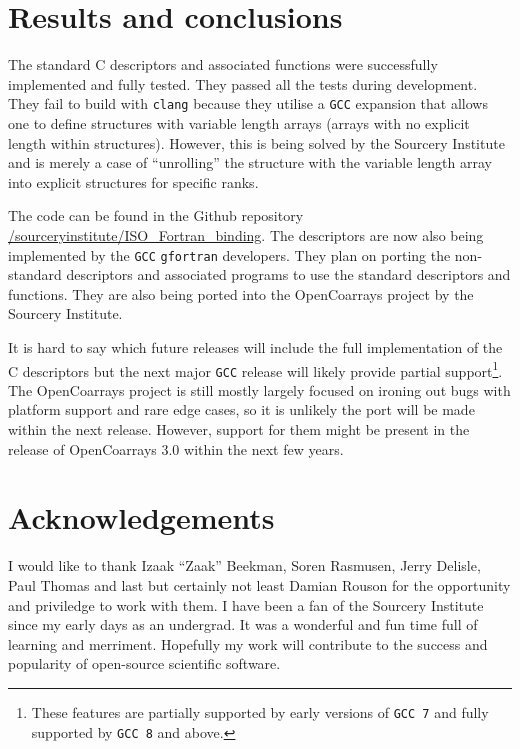 \section{Results and conclusions}

The standard C descriptors and associated functions were successfully implemented and fully tested. They passed all the tests during development. They fail to build with \texttt{clang} because they utilise a \texttt{GCC} expansion that allows one to define structures with variable length arrays (arrays with no explicit length within structures). However, this is being solved by the Sourcery Institute \cite{sourcery} and is merely a case of ``unrolling'' the structure with the variable length array into explicit structures for specific ranks.

The code can be found in the Github repository \newline{}\href{https://github.com/sourceryinstitute/ISO_Fortran_binding}{/sourceryinstitute/ISO\_Fortran\_binding}. The descriptors are now also being implemented by the \texttt{GCC} \texttt{gfortran} developers. They plan on porting the non-standard descriptors and associated programs to use the standard descriptors and functions. They are also being ported into the OpenCoarrays project \cite{ocafp} by the Sourcery Institute.

It is hard to say which future releases will include the full implementation of the C descriptors but the next major \texttt{GCC} release will likely provide partial support\footnote{These features are partially supported by early versions of \texttt{GCC 7} and fully supported by \texttt{GCC 8} and above.}. The OpenCoarrays project is still mostly largely focused on ironing out bugs with platform support and rare edge cases, so it is unlikely the port will be made within the next release. However, support for them might be present in the release of OpenCoarrays 3.0 within the next few years.

\section{Acknowledgements}

I would like to thank Izaak ``Zaak'' Beekman, Soren Rasmusen, Jerry Delisle, Paul Thomas and last but certainly not least Damian Rouson for the opportunity and priviledge to work with them. I have been a fan of the Sourcery Institute since my early days as an undergrad. It was a wonderful and fun time full of learning and merriment. Hopefully my work will contribute to the success and popularity of open-source scientific software.